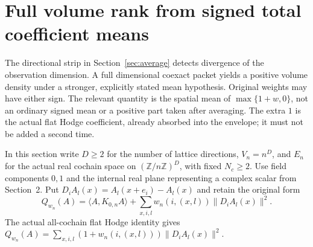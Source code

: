 \documentclass[11pt]{article}
\begin{document}
\section{Full volume rank from signed total coefficient means}\label{sec:volume-mean}
The directional strip in Section~\ref{sec:average} detects divergence of the
observation dimension. A full dimensional coexact packet yields a positive
volume density under a stronger, explicitly stated mean hypothesis. Original
weights may have either sign. The relevant quantity is the spatial mean of
$\max\{1+w,0\}$, not an ordinary signed mean or a positive part taken after
averaging. The extra $1$ is the actual flat Hodge coefficient, already absorbed
into the envelope; it must not be added a second time.

In this section write $D\geq2$ for the number of lattice directions,
$V_n=n^D$, and $E_n$ for the actual real cochain space on
$(\mathbb Z/n\mathbb Z)^D$, with fixed $N_c\geq2$. Use field components
$0,1$ and the internal real plane representing a complex scalar from
Section~2. Put $D_i A_l(x)=A_l(x+e_i)-A_l(x)$ and retain the original form
\[
 Q_{w_n}(A)=\langle A,K_{0,n}A\rangle+
       \sum_{x,i,l}w_n(i,(x,l))\|D_i A_l(x)\|^2.
\]
The actual all-cochain flat Hodge identity gives
$Q_{w_n}(A)=\sum_{x,i,l}(1+w_n(i,(x,l)))\|D_i A_l(x)\|^2$.
\end{document}
